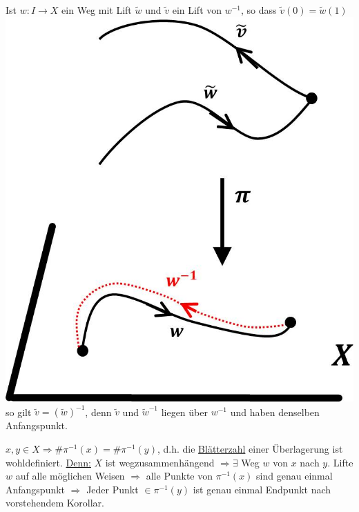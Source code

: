 \documentclass[a4paper,11pt,notitlepage]{report}
\theoremstyle{definition}
\begin{document}
\begin{corollary}
	Ist $w \colon I \rightarrow X$ ein Weg mit Lift $\widetilde{w}$ und $\widetilde{v}$ ein Lift von $w^{-1}$, so dass $\widetilde{v}(0) = \widetilde{w}(1)$ 
\newline
\includegraphics[scale=0.4]{images/Lift_inverser_Weg.jpg}\newline
	so gilt $\widetilde{v} = (\widetilde{w})^{-1}$, denn $\widetilde{v}$ und $\widetilde{w}^{-1}$ liegen über $w^{-1}$ und haben denselben Anfangspunkt.
\end{corollary}

\begin{corollary}
	$x,y \in X \Rightarrow \# \pi^{-1}(x) = \# \pi^{-1}(y)$, d.h. die \underline{Blätterzahl} einer Überlagerung ist wohldefiniert.
	\newline
	\underline{Denn:} $X$ ist wegzusammenhängend $\Rightarrow \exists$ Weg $w$ von $x$ nach $y$. Lifte $w$ auf alle möglichen Weisen $\Rightarrow$ alle Punkte von $\pi^{-1}(x)$ %
	sind genau einmal Anfangspunkt $\Rightarrow$ Jeder Punkt $\in \pi^{-1}(y)$ ist genau einmal Endpunkt nach vorstehendem Korollar.	
\end{corollary}
\end{document}
